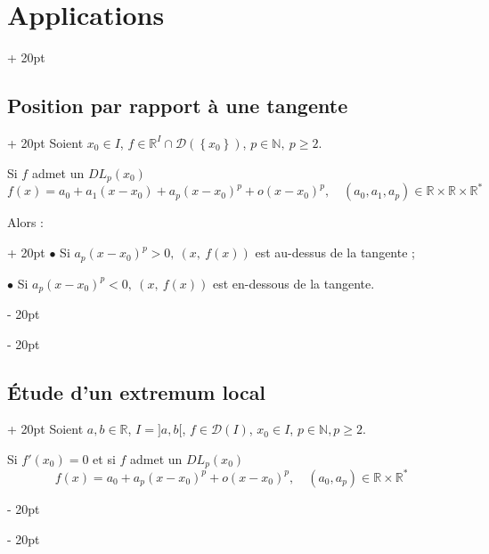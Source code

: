 \documentclass[a4paper, 12pt, twoside]{article}
\newcommand{\N}{\mathbb{N}} %
\newcommand{\R}{\mathbb{R}} %
\newcommand{\set}[1]{\left\{ #1 \right\}}
\renewcommand{\ge}{\geqslant}
\newcommand{\ind}[1][20pt]{\advance\leftskip + #1}
\newcommand{\deind}[1][20pt]{\advance\leftskip - #1}
\newenvironment{indt}[2][20pt]{#2 \par \ind[#1]}{\par \deind} %
\begin{document}
    \begin{indt}{\section{Applications}}
        
        \begin{indt}{\subsection{Position par rapport à une tangente}}
            Soient $x_0 \in I$, $f \in \R^I \cap \mathcal D(\set{x_0})$, $p \in \N,\ p \ge 2$.
            
            \vspace{6pt}
            
            Si $f$ admet un $DL_p(x_0)$
                \[ f(x) = a_0 + a_1(x - x_0) + a_p(x - x_0)^p + o(x - x_0)^p, \quad (a_0, a_1, a_p) \in \R \times \R \times \R^* \]
            
            \newpage
            
            \begin{indt}{Alors :} %
                $\bullet$ Si $a_p (x - x_0)^p > 0,\ (x,\ f(x))$ est au-dessus de la tangente ;
                
                $\bullet$ Si $a_p (x - x_0)^p < 0,\ (x,\ f(x))$ est en-dessous de la tangente.
            \end{indt}
        \end{indt}
        
        \vspace{12pt}
        
        \begin{indt}{\subsection{\'Etude d'un extremum local}}
            Soient $a, b \in \R$, $I = ]a, b[$, $f \in \mathcal D(I)$, $x_0 \in I$, $p \in \N, p \ge 2$.
            
            \vspace{6pt}
            
            Si $f'(x_0) = 0$ et si $f$ admet un $DL_p(x_0)$
                \[ f(x) = a_0 + a_p (x - x_0)^p + o(x - x_0)^p, \quad (a_0, a_p) \in \R \times \R^* \]
            

\end{indt}
\end{indt}
\end{document}
